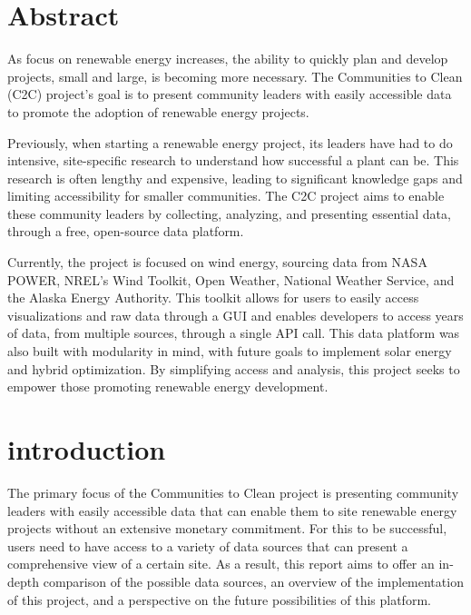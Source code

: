 \documentclass[12pt, oneside]{article}   	%
\begin{document}
\section*{Abstract}
\begin{adjustwidth}{.5in}{.5in}
	As focus on renewable energy increases, the ability to quickly plan and
	develop projects, small and large, is becoming more necessary. The
	Communities to Clean (C2C) project's goal is to present community leaders
	with easily accessible data to promote the adoption of renewable energy
	projects.

	Previously, when starting a renewable energy project, its leaders have had
	to do intensive, site-specific research to understand how successful a plant
	can be. This research is often lengthy and expensive, leading to significant
	knowledge gaps and limiting accessibility for smaller communities. The C2C
	project aims to enable these community leaders by collecting, analyzing, and
	presenting essential data, through a free, open-source data platform.

	Currently, the project is focused on wind energy, sourcing data from NASA
	POWER, NREL's Wind Toolkit, Open Weather, National Weather Service, and the
	Alaska Energy Authority. This toolkit allows for users to easily access
	visualizations and raw data through a GUI and enables developers to access
	years of data, from multiple sources, through a single API call. This data
	platform was also built with modularity in mind, with future goals to
	implement solar energy and hybrid optimization. By simplifying access and
	analysis, this project seeks to empower those promoting renewable energy
	development.
\end{adjustwidth}

\section{introduction}

The primary focus of the Communities to Clean project is presenting community
leaders with easily accessible data that can enable them to site renewable
energy projects without an extensive monetary commitment. For this to be
successful, users need to have access to a variety of data sources that can
present a comprehensive view of a certain site. As a result, this report aims to
offer an in-depth comparison of the possible data sources, an overview of the
implementation of this project, and a perspective on the future possibilities of
this platform.
\end{document}
